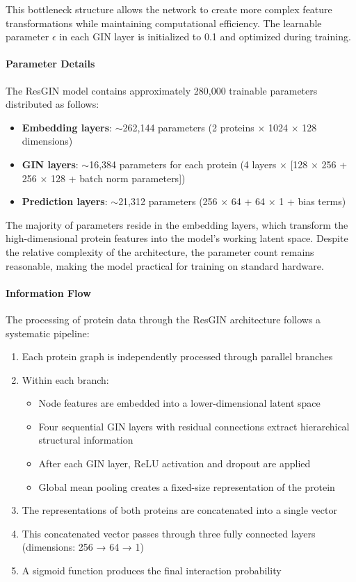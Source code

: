 \documentclass[conference]{IEEEtran}
\begin{document}
This bottleneck structure allows the network to create more complex feature transformations while maintaining computational efficiency. The learnable parameter $\epsilon$ in each GIN layer is initialized to 0.1 and optimized during training.

\paragraph{Parameter Details}
The ResGIN model contains approximately 280,000 trainable parameters distributed as follows:
\begin{itemize}
    \item \textbf{Embedding layers}: $\sim$262,144 parameters (2 proteins × 1024 × 128 dimensions)
    \item \textbf{GIN layers}: $\sim$16,384 parameters for each protein (4 layers × [128 × 256 + 256 × 128 + batch norm parameters])
    \item \textbf{Prediction layers}: $\sim$21,312 parameters (256 × 64 + 64 × 1 + bias terms)
\end{itemize}

The majority of parameters reside in the embedding layers, which transform the high-dimensional protein features into the model's working latent space. Despite the relative complexity of the architecture, the parameter count remains reasonable, making the model practical for training on standard hardware.

\paragraph{Information Flow}
The processing of protein data through the ResGIN architecture follows a systematic pipeline:
\begin{enumerate}
    \item Each protein graph is independently processed through parallel branches
    \item Within each branch:
    \begin{itemize}
        \item Node features are embedded into a lower-dimensional latent space
        \item Four sequential GIN layers with residual connections extract hierarchical structural information
        \item After each GIN layer, ReLU activation and dropout are applied
        \item Global mean pooling creates a fixed-size representation of the protein
    \end{itemize}
    \item The representations of both proteins are concatenated into a single vector
    \item This concatenated vector passes through three fully connected layers (dimensions: 256 → 64 → 1)
    \item A sigmoid function produces the final interaction probability
\end{enumerate}
\end{document}
